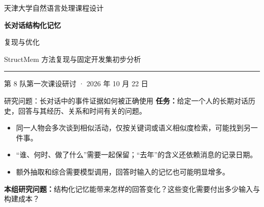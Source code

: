 \documentclass[aspectratio=169,10pt]{beamer}
\begin{document}
\begin{frame}[plain]
  \vspace{5mm}
  {\color{accent}\large 天津大学自然语言处理课程设计\par}
  \vspace{6mm}
  {\fontsize{24}{31}\selectfont\bfseries 长对话结构化记忆\par 复现与优化\par}
  \vspace{4mm}
  {\large StructMem 方法复现与固定开发集初步分析\par}
  \vspace{6mm}
  \textcolor{accent}{\rule{\linewidth}{0.7pt}}\par\vspace{3mm}
  第 8 队\hfill 第一次课设研讨 · 2026 年 10 月 22 日\par
\end{frame}

\begin{frame}[t]{研究问题：长对话中的事件证据如何被正确使用}
  \vspace{1mm}
  \textbf{任务：}给定一个人的长期对话历史，回答与其经历、关系和时间有关的问题。\par
  \vspace{3mm}
  \begin{itemize}\setlength{\itemsep}{2.5mm}
    \item {}同一人物会多次谈到相似活动，仅按关键词或语义相似度检索，可能找到另一件事。
    \item {}“谁、何时、做了什么”需要一起保留；“去年”的含义还依赖消息的记录日期。
    \item {}额外抽取和综合需要模型调用，回答时输入的记忆也可能明显增多。
  \end{itemize}
  \vspace{3mm}
  \textbf{本组研究问题：}结构化记忆能带来怎样的回答变化？这些变化需要付出多少输入与构建成本？
\end{frame}
\end{document}
